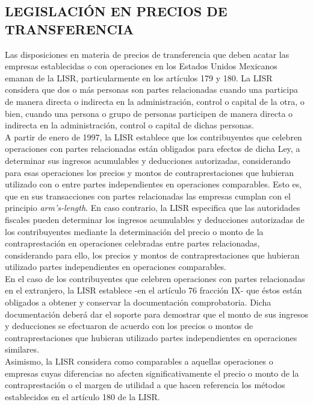 \subsection{LEGISLACIÓN EN PRECIOS DE TRANSFERENCIA}

Las disposiciones en materia de precios de transferencia que deben acatar las empresas establecidas o con operaciones en los Estados Unidos Mexicanos emanan de la LISR, particularmente en los artículos 179 y 180. La LISR considera que dos o más personas son partes relacionadas cuando una participa de manera directa o indirecta en la administración, control o capital de la otra, o bien, cuando una persona o grupo de personas participen de manera directa o indirecta en la administración, control o capital de dichas personas.\\

A partir de enero de 1997, la LISR establece que los contribuyentes que celebren operaciones con partes relacionadas están obligados para efectos de dicha Ley, a determinar sus ingresos acumulables y deducciones autorizadas, considerando para esas operaciones los precios y montos de contraprestaciones que hubieran utilizado con o entre partes independientes en operaciones comparables. Esto es, que en sus transacciones con partes relacionadas las empresas cumplan con el principio \textit{arm's-length}. En caso contrario, la LISR especifica que las autoridades fiscales pueden determinar los ingresos acumulables y deducciones autorizadas de los contribuyentes mediante la determinación del precio o monto de la contraprestación en operaciones celebradas entre partes relacionadas, considerando para ello, los precios y montos de contraprestaciones que hubieran utilizado partes independientes en operaciones comparables.\\

En el caso de los contribuyentes que celebren operaciones con partes relacionadas en el extranjero, la LISR establece -en el artículo 76 fracción IX- que éstos están obligados a obtener y conservar la documentación comprobatoria. Dicha documentación deberá dar el soporte para demostrar que el monto de sus ingresos y deducciones se efectuaron de acuerdo con los precios o montos de contraprestaciones que hubieran utilizado partes independientes en operaciones similares.\\

Asimismo, la LISR considera como comparables a aquellas operaciones o empresas cuyas diferencias no afecten significativamente el precio o monto de la contraprestación o el margen de utilidad a que hacen referencia los métodos establecidos en el artículo 180 de la LISR. \\

